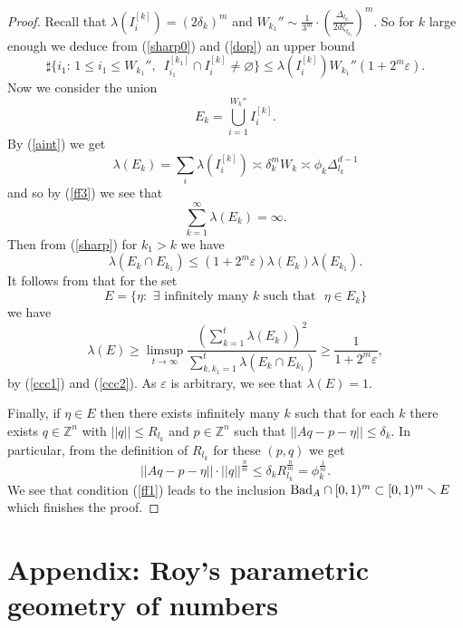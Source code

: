 \documentclass[reqno,11pt, twoside]{amsart}
\theoremstyle{plain}
\theoremstyle{definition}
\theoremstyle{definition}
\theoremstyle{remark}
\numberwithin{equation}{section}
\newcommand{\sm}{\smallsetminus}
\begin{document}
\begin{proof}
Recall that  $\lambda (I_i^{[k]}) = (2\delta_k)^m  $ and
$ W_{k_1}'' \sim \frac{1}{3^m}\cdot \left( \frac{\Delta_{l_{k_1}}}{2d\zeta_{l_{k_1}}}\right)^m$.
So for $k$ large enough
 we deduce from (\ref{sharp0})  and (\ref{dop}) an upper bound
 \begin{equation}\label{sharp}
  \sharp \{ i_1:\, 1\le i_1\le W_{k_1}'',\,\,\,  I_{i_1}^{[k_1]} \cap I^{[k]}_i \neq \varnothing \}   \le
  \lambda (I_i^{[k]}) W_{k_1}'' (1+2^m\varepsilon).
 \end{equation}
 Now we consider the union
 $$
 E_k = \bigcup_{i=1}^{W_k''} I_i^{[k]}.
 $$
 By (\ref{aint})  we get
 $$
 \lambda (E_k)=  \sum_{i} \lambda (   I_i^{[k]})\asymp
 \delta_k^m W_k\asymp
 \phi_k 
 \Delta_{l_k}^{d-1}
 $$
 and so 
by (\ref{ff3}) we see that 
  \begin{equation}\label{ccc1}
  \sum_{k=1}^\infty
 \lambda (E_k) = \infty.
 \end{equation}
 Then from (\ref{sharp}) for $ k_1> k$ we have
   \begin{equation}\label{ccc2}
 \lambda (E_k\cap E_{k_1} )\le (1+ 2^m\varepsilon)  \lambda (E_k)  \lambda (E_{k_1})
.
 \end{equation} 
 It follows from \cite[Theorem 18.10]{Gut}
 that for the set
 $$
  E = \{ {\eta}:\,\, \exists \,\,\text{infinitely many}\,\, k\,\,
  \text{such that }\,\, {\eta} \in E_k\}
  $$
  we have
  $$
  \lambda (E)
  \ge
  \limsup_{t\to \infty}
  \frac{\left(\sum_{k=1}^t   \lambda (E_k) \right)^2}{  \sum_{k,k_1 =1}^t \lambda (E_k \cap E_{k_1})} \ge \frac{1}{1+ 2^m\varepsilon},
  $$
  by (\ref{ccc1}) and (\ref{ccc2}).   As $\varepsilon $ is arbitrary, we see that  $
  \lambda (E) = 1$.
  
  Finally, if $\eta \in E$ then there exists infinitely many $k$ such that for each $k$  there exists
  $ q\in \mathbb{Z}^n$ with $ ||q||\le R_{l_k}$ and $p\in \mathbb{Z}^n$ such that 
  $ ||Aq-p-\eta|| \le \delta_k$. In particular, from the definition of $R_{l_k}$    for these $(p,q)$ we get
  $$
   ||Aq-p-\eta|| \cdot ||q||^{\frac{n}{m}}\le
   \delta_k R_{l_k}^{\frac{n}{m}}=
    \phi_k^{\frac{1}{m}}.
   $$
We see that  condition (\ref{ff1}) leads to the inclusion 
  ${\rm Bad}_A\cap [0,1)^m \subset [0,1)^m \sm E$ which finishes the proof.
   \end{proof}
 
 



\section{Appendix: Roy's parametric geometry of numbers}\label{sec: Roy}
\end{document}
